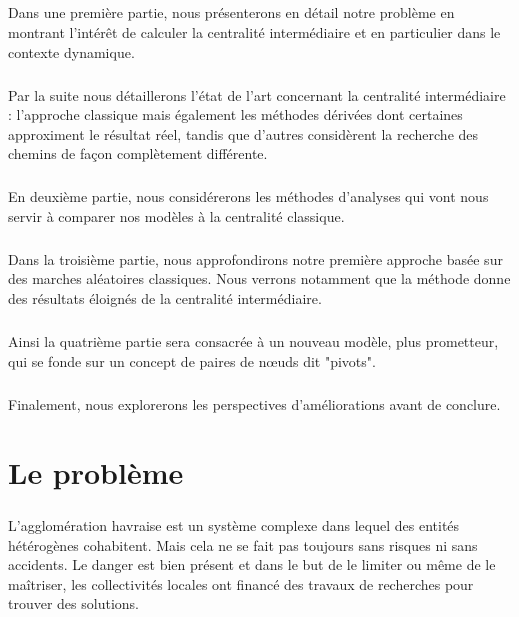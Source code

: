 \documentclass[a4paper, 10pt]{report}
\begin{document}
\paragraph{}Dans une première partie, nous présenterons en détail notre problème en montrant l'intérêt de calculer la centralité intermédiaire et en particulier dans le contexte dynamique.

\paragraph{}Par la suite nous détaillerons l'état de l'art concernant la centralité intermédiaire : l'approche classique mais également les méthodes dérivées dont certaines approximent le résultat réel, tandis que d'autres considèrent la recherche des chemins de façon complètement différente.

\paragraph{}En deuxième partie, nous considérerons les méthodes d'analyses qui vont nous servir à comparer nos modèles à la centralité classique.

\paragraph{}Dans la troisième partie, nous approfondirons notre première approche basée sur des marches aléatoires classiques. Nous verrons notamment que la méthode donne des résultats éloignés de la centralité intermédiaire.

\paragraph{}Ainsi la quatrième partie sera consacrée à un nouveau modèle, plus prometteur, qui se fonde sur un concept de paires de n\oe uds dit "pivots". 

\paragraph{}Finalement, nous explorerons les perspectives d'améliorations avant de conclure.

\chapter{Le problème}

\paragraph{}L'agglomération havraise est un système complexe dans lequel des entités hétérogènes cohabitent. Mais cela ne se fait pas toujours sans risques ni sans accidents. Le danger est bien présent et dans le but de le limiter ou même de le maîtriser, les collectivités locales ont financé des travaux de recherches pour trouver des solutions. 
\end{document}
